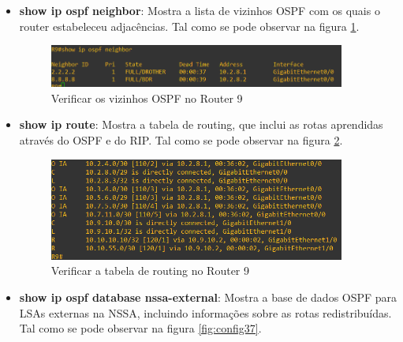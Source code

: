 \documentclass[11pt,english, openright, oneside]{book}
\begin{document}
\begin{itemize}
  \item \textbf{show ip ospf neighbor}: Mostra a lista de vizinhos OSPF com os quais o router estabeleceu adjacências. Tal como se pode observar na figura \ref{fig:config35}.
  \vspace{0.2cm}

  \begin{figure}[H]
    \centering
    \includegraphics[width=0.92\textwidth]{imagens/Tarefa4/22.ospf_neigh_R9.png}
    \caption{Verificar os vizinhos OSPF no Router 9}
    \label{fig:config35}
  \end{figure}
  \vspace{0.2cm}

  \newpage
  \item \textbf{show ip route}: Mostra a tabela de routing, que inclui as rotas aprendidas através do OSPF e do RIP. Tal como se pode observar na figura \ref{fig:config36}.
  \vspace{0.2cm}

  \begin{figure}[H]
    \centering
    \includegraphics[width=0.92\textwidth]{imagens/Tarefa4/22.route_R9.png}
    \caption{Verificar a tabela de routing no Router 9}
    \label{fig:config36}
  \end{figure}
  \vspace{0.2cm}

  \newpage
  \item \textbf{show ip ospf database nssa-external}: Mostra a base de dados OSPF para LSAs externas na NSSA, incluindo informações sobre as rotas redistribuídas. Tal como se pode observar na figura \ref{fig:config37}.
  \vspace{0.2cm}


\end{itemize}
\end{document}
